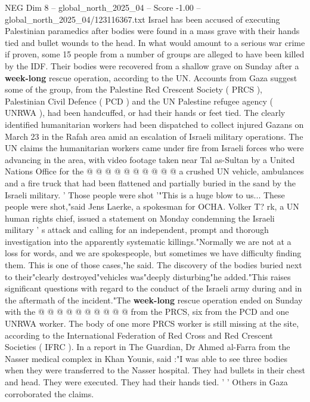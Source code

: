 \begin{textsample}{NEG Dim 8 – global\_north\_2025\_04 – Score -1.00 – global\_north\_2025\_04/123116367.txt}  \label{ex:f8_neg_427}
Israel has been accused of executing Palestinian paramedics after bodies were found in a mass grave with their hands tied and bullet wounds to the head.
In what would amount to a serious war crime if proven, some 15 people from a number of groups are alleged to have been killed by the IDF.
Their bodies were recovered from a shallow grave on Sunday after a \textbf{week-long} rescue operation, according to the UN.
Accounts from Gaza suggest some of the group, from the Palestine Red Crescent Society ( PRCS ), Palestinian Civil Defence ( PCD ) and the UN Palestine refugee agency ( UNRWA ), had been handcuffed, or had their hands or feet tied.
The clearly identified humanitarian workers had been dispatched to collect injured Gazans on March 23 in the Rafah area amid an escalation of Israeli military operations.
The UN claims the humanitarian workers came under fire from Israeli forces who were advancing in the area, with video footage taken near Tal as-Sultan by a United Nations Office for the @ @ @ @ @ @ @ @ @ @ a crushed UN vehicle, ambulances and a fire truck that had been flattened and partially buried in the sand by the Israeli military. ' Those people were shot '"This is a huge blow to us...
These people were shot,"said Jens Laerke, a spokesman for OCHA.
Volker T? rk, a UN human rights chief, issued a statement on Monday condemning the Israeli military ' s attack and calling for an independent, prompt and thorough investigation into the apparently systematic killings."Normally we are not at a loss for words, and we are spokespeople, but sometimes we have difficulty finding them.
This is one of those cases,"he said.
The discovery of the bodies buried next to their"clearly destroyed"vehicles was"deeply disturbing"he added."This raises significant questions with regard to the conduct of the Israeli army during and in the aftermath of the incident."The \textbf{week-long} rescue operation ended on Sunday with the @ @ @ @ @ @ @ @ @ @ from the PRCS, six from the PCD and one UNRWA worker.
The body of one more PRCS worker is still missing at the site, according to the International Federation of Red Cross and Red Crescent Societies ( IFRC ).
In a report in The Guardian, Dr Ahmed al-Farra from the Nasser medical complex in Khan Younis, said :"I was able to see three bodies when they were transferred to the Nasser hospital.
They had bullets in their chest and head.
They were executed.
They had their hands tied. ' ' Others in Gaza corroborated the claims.

\end{textsample}
